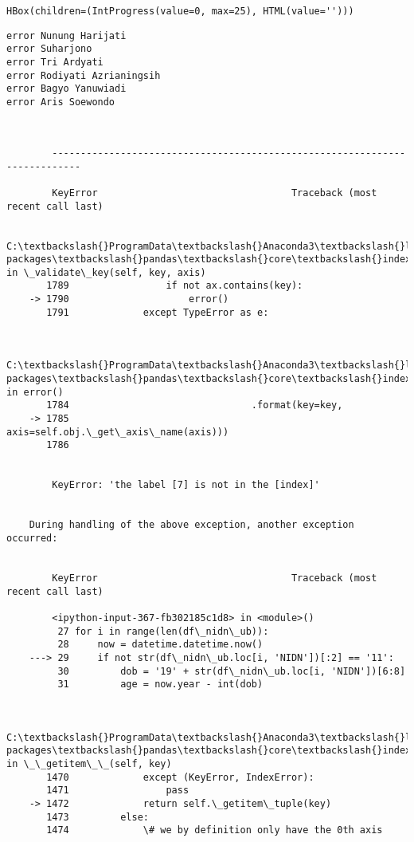 \documentclass[11pt]{article}
\begin{document}
    
    \begin{verbatim}
HBox(children=(IntProgress(value=0, max=25), HTML(value='')))
    \end{verbatim}

    
    \begin{Verbatim}[commandchars=\\\{\}]
error Nunung Harijati
error Suharjono
error Tri Ardyati
error Rodiyati Azrianingsih
error Bagyo Yanuwiadi
error Aris Soewondo


    \end{Verbatim}

    \begin{Verbatim}[commandchars=\\\{\}]

        ---------------------------------------------------------------------------

        KeyError                                  Traceback (most recent call last)

        C:\textbackslash{}ProgramData\textbackslash{}Anaconda3\textbackslash{}lib\textbackslash{}site-packages\textbackslash{}pandas\textbackslash{}core\textbackslash{}indexing.py in \_validate\_key(self, key, axis)
       1789                 if not ax.contains(key):
    -> 1790                     error()
       1791             except TypeError as e:
    

        C:\textbackslash{}ProgramData\textbackslash{}Anaconda3\textbackslash{}lib\textbackslash{}site-packages\textbackslash{}pandas\textbackslash{}core\textbackslash{}indexing.py in error()
       1784                                .format(key=key,
    -> 1785                                        axis=self.obj.\_get\_axis\_name(axis)))
       1786 
    

        KeyError: 'the label [7] is not in the [index]'

        
    During handling of the above exception, another exception occurred:
    

        KeyError                                  Traceback (most recent call last)

        <ipython-input-367-fb302185c1d8> in <module>()
         27 for i in range(len(df\_nidn\_ub)):
         28     now = datetime.datetime.now()
    ---> 29     if not str(df\_nidn\_ub.loc[i, 'NIDN'])[:2] == '11':
         30         dob = '19' + str(df\_nidn\_ub.loc[i, 'NIDN'])[6:8]
         31         age = now.year - int(dob)
    

        C:\textbackslash{}ProgramData\textbackslash{}Anaconda3\textbackslash{}lib\textbackslash{}site-packages\textbackslash{}pandas\textbackslash{}core\textbackslash{}indexing.py in \_\_getitem\_\_(self, key)
       1470             except (KeyError, IndexError):
       1471                 pass
    -> 1472             return self.\_getitem\_tuple(key)
       1473         else:
       1474             \# we by definition only have the 0th axis
    


\end{Verbatim}
\end{document}
